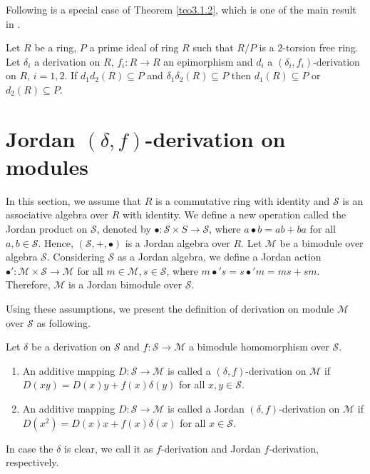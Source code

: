 \documentclass{arxiv}
\begin{document}
Following is a special case of Theorem \ref{teo3.1.2}, which is one of the main result in \cite{creedon}. 
\begin{corollary}\label{corprime}
    Let $R$ be a ring, $P$ a prime ideal of ring $R$ such that $R/P$ is a $2$-torsion free ring. 
    Let $\delta_i$ a derivation on $R$,  $f_i : R \rightarrow R$ an epimorphism and $d_i$ a  $(\delta_i,f_i)$-derivation on   $R$, $i=1,2$. If $d_1d_2(R) \subseteq P$ and $\delta_1 \delta_2 (R) \subseteq P$ then $d_1(R)\subseteq P$ or $d_2(R) \subseteq P$.
\end{corollary}

\section{Jordan $(\delta,f)$-derivation on modules}

In this section, we assume that $R$ is a commutative ring with identity and $\mathcal{S}$ is an associative algebra over $R$ with identity. We define a new operation called the Jordan product on $\mathcal{S}$, denoted by $\bullet : \mathcal{S} \times S \rightarrow \mathcal{S}$, where $a \bullet b = ab+ba$ for all $a,b \in \mathcal{S}$. Hence, $(\mathcal{S}, +, \bullet)$ is a Jordan algebra over $R$. Let $\mathcal{M}$ be a bimodule over algebra $\mathcal{S}$. 
Considering $\mathcal{S}$ as a Jordan algebra, we define a Jordan action  $\bullet':\mathcal{M} \times \mathcal{S} \rightarrow \mathcal{M}$ for all $m \in \mathcal{M}, s \in \mathcal{S}$, where $m \bullet' s = s\bullet' m = ms+sm$. Therefore, $\mathcal{M}$ is a Jordan bimodule over $\mathcal{S}$.

Using these assumptions, we present the definition of derivation on module $\mathcal{M}$ over $\mathcal{S}$ as following.
\begin{definition}\label{def3.3.(1)} Let $\delta$ be a derivation on $\mathcal{S}$ and $f: \mathcal{S} \rightarrow \mathcal{M}$ a bimodule homomorphism over $\mathcal{S}$. 
    \begin{enumerate}[label=(\roman*)]
    \item An additive mapping $D: \mathcal{S} \rightarrow \mathcal{M}$ is called a $(\delta,f)$-derivation on $\mathcal{M}$ if $D(xy)= D(x)y+f(x)\delta(y)$ for all $x,y \in \mathcal{S}$.
\item An additive mapping $D: \mathcal{S} \rightarrow \mathcal{M}$ is called a Jordan $(\delta,f)$-derivation on $\mathcal{M}$ if $D(x^2)= D(x)x+f(x)\delta(x)$ for all $x \in \mathcal{S}$.
\end{enumerate}
\end{definition}
In case the $\delta$ is clear, we call it as $f$-derivation and Jordan $f$-derivation, respectively.
\end{document}
